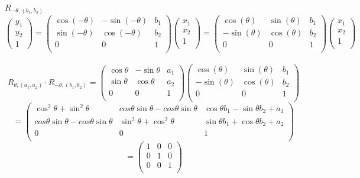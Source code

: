 \documentclass[12pt]{article}
\begin{document}
$R_{-\theta, (b_1,b_2)}$ \\
\[
\begin{pmatrix}
y_1 \\
y_2 \\
1
\end{pmatrix}
=
\begin{pmatrix}
\cos(-\theta) & -\sin(-\theta) & b_1 \\
\sin(-\theta) & \cos(-\theta) & b_2 \\
0 & 0 & 1 \\
\end{pmatrix}
\begin{pmatrix}
x_1 \\
x_2 \\
1 \\
\end{pmatrix}
=
\begin{pmatrix}
\cos(\theta) & \sin(\theta) & b_1 \\
-\sin(\theta) & \cos(\theta) & b_2 \\
0 & 0 & 1 \\
\end{pmatrix}
\begin{pmatrix}
x_1 \\
x_2 \\
1 \\
\end{pmatrix}
\] \\

\[
R_{\theta, (a_1,a_2)} \cdot R_{-\theta, (b_1,b_2)} =
\begin{pmatrix}
\cos\theta & -\sin\theta & a_1 \\
\sin\theta & \cos\theta & a_2 \\
0 & 0 & 1 \\
\end{pmatrix}
\begin{pmatrix}
\cos(\theta) & \sin(\theta) & b_1 \\
-\sin(\theta) & \cos(\theta) & b_2 \\
0 & 0 & 1 \\
\end{pmatrix}
\]
\[
=
\begin{pmatrix}
\cos^2\theta + \sin^2\theta & cos\theta \sin\theta - cos\theta \sin\theta & \cos\theta b_1 - \sin \theta b_2 + a_1 \\
cos\theta \sin\theta - cos\theta \sin\theta & \sin^2\theta + \cos^2\theta  & \sin\theta b_1 + \cos\theta b_2 + a_2\\
0 & 0 & 1 \\
\end{pmatrix}
\]
\[
=
\begin{pmatrix}
1 & 0 & 0 \\
0 & 1  & 0 \\
0 & 0 & 1 \\
\end{pmatrix}
\]
\end{document}
